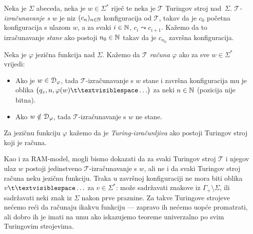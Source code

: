\begin{definicija}[{name=[Turing-izračunljiva jezična funkcija]}]\label{def:Tcomputefi}
Neka je $\Sigma$ abeceda, neka je $w\in\Sigma^*$ riječ te neka je $\mathcal T$ Turingov stroj nad~$\Sigma$. \emph{$\mathcal T$\!-izračunavanje s $w$} je niz $(c_n)_{n\in{\mathbb N}}$ konfiguracija od $\mathcal T$, takav da je $c_0$ početna konfiguracija s ulazom $w$, a za svaki $i\in{\mathbb N}$, $c_i\leadsto c_{i+1}$. Kažemo da to izračunavanje \emph{stane} ako postoji $n_0\in{\mathbb N}$ takav da je $c_{n_0}$ završna konfiguracija.

Neka je $\varphi$ jezična funkcija nad $\Sigma$. Kažemo da $\mathcal T$ \emph{računa} $\varphi$ ako za sve $w\in\Sigma^*$ vrijedi:
\begin{itemize}
    \item Ako je $w\in\mathcal D_{\varphi}$, tada $\mathcal T$\!-izračunavanje s $w$ stane i završna konfiguracija mu je oblika $\bigl(q_z,n,\varphi(w)\bl\ldots\bigr)$ za neki $n\in{\mathbb N}$ (pozicija nije bitna).
    \item Ako $w\notin\mathcal D_{\varphi}$, tada $\mathcal T$\!-izračunavanje s $w$ ne stane.
\end{itemize}
Za jezičnu funkciju $\varphi$ kažemo da je \emph{Turing-izračunljiva} ako postoji Turingov stroj koji je računa.
\end{definicija}

Kao i za RAM-model, mogli bismo dokazati da za svaki Turingov stroj $\mathcal T$ i njegov ulaz $w$ postoji jedinstveno $\mathcal T$\!-izračunavanje s $w$, ali ne i da svaki Turingov stroj računa neku jezičnu funkciju. Traka u završnoj konfiguraciji ne mora biti oblika $v\bl\ldots$ za $v\in\Sigma^*$: može sadržavati znakove iz $\Gamma_+\!\setminus\Sigma$, ili sadržavati neki znak iz $\Sigma$ nakon prve praznine. Za takve Turingove strojeve nećemo reći da računaju ikakvu funkciju --- zapravo ih nećemo uopće promatrati, ali dobro ih je imati na umu ako iskazujemo teoreme univerzalno po svim Turingovim strojevima.


